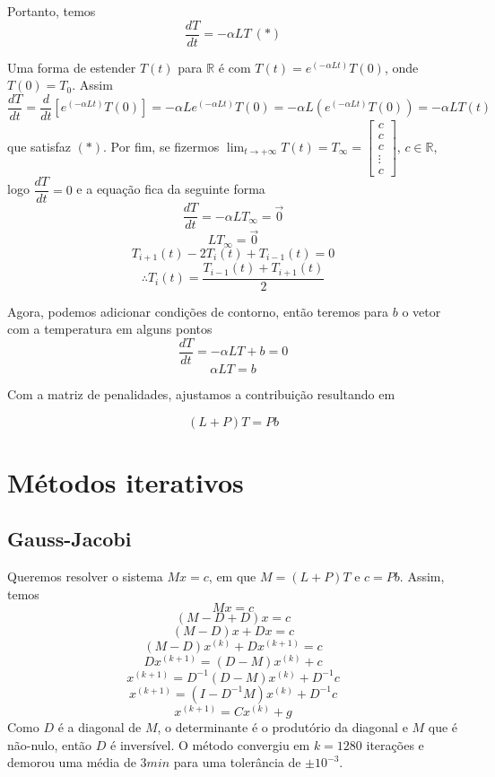 \documentclass{article}
\begin{document}
    Portanto, temos
    \[\frac{dT}{dt} = -\alpha LT\ (*)\]
    
    Uma forma de estender $T(t)$ para $\mathbb{R}$ é com $T(t) = e^{(-\alpha Lt)}T(0)$, onde $T(0) = T_0$. Assim
    \[\frac{dT}{dt} = \frac{d}{dt}[e^{(-\alpha Lt)}T(0)] = -\alpha L e^{(-\alpha Lt)}T(0) = -\alpha L (e^{(-\alpha Lt)}T(0)) = -\alpha L T(t)\]
    que satisfaz $(*)$. Por fim, se fizermos $\displaystyle{ \lim_{t \to +\infty} T(t) = T_\infty = \left[ \begin{array}{c}
        c\\
        c\\
        c\\
        \vdots\\
        c
    \end{array} \right] }$, $c \in \mathbb{R}$, logo $\dfrac{dT}{dt} = 0$ e a equação fica da seguinte forma
    \[\frac{dT}{dt} = -\alpha LT_\infty = \vec{0}\]
    \[LT_\infty = \vec{0}\]
    \[T_{i+1}(t)-2T_i(t)+T_{i-1}(t) = 0\]
    \[\therefore T_i(t) = \frac{T_{i-1}(t)+T_{i+1}(t)}{2}\]

    Agora, podemos adicionar condições de contorno, então teremos para $b$ o vetor com a temperatura em alguns pontos 
    \[\frac{dT}{dt} = -\alpha LT + b = 0\]
    \[\alpha LT = b\]

    Com a matriz de penalidades, ajustamos a contribuição resultando em

    \[(L+P)T = Pb\]

    \newpage

    \section{Métodos iterativos}

    \subsection{Gauss-Jacobi}
    Queremos resolver o sistema $Mx = c$, em que $M = (L+P)T$ e $c = Pb$. Assim, temos
    \[Mx = c\]
    \[(M-D+D)x = c\]
    \[(M-D)x + Dx = c\]
    \[(M-D)x^{(k)} + Dx^{(k+1)} = c\]
    \[Dx^{(k+1)} = (D-M)x^{(k)} + c\]
    \[x^{(k+1)} = D^{-1}(D-M)x^{(k)}+D^{-1}c\]
    \[x^{(k+1)} = (I-D^{-1}M)x^{(k)}+D^{-1}c\]
    \[x^{(k+1)} = Cx^{(k)} + g\]
    Como $D$ é a diagonal de $M$, o determinante é o produtório da diagonal e $M$ que é não-nulo, então $D$ é inversível. O método convergiu em $k = 1280$ iterações e demorou uma média de $3min$ para uma tolerância de $\pm 10^{-3}$.
\end{document}
